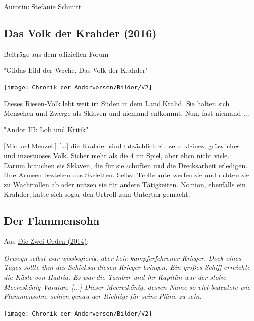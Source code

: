 \documentclass[10pt, a4paper, oneside]{book}
\newcommand{\fillbreak}{\vspace*{\fill}\columnbreak}
\newcommand{\storytext}[1]{%
    \section{#1}%
    \label{Storytext: #1}%
}
\newcommand{\refstorytext}[1]{\hyperref[Storytext: #1]{#1}}
\newcommand{\bildmitts}[2][height=0.32\textwidth,width=0.48\textwidth,keepaspectratio]{%
    \begin{center}
        \texttt{[image: Chronik der Andorversen/Bilder/\#2]}
    \end{center}
}
\newcommand{\bildlinks}[2][height=0.32\textwidth,width=0.48\textwidth,keepaspectratio]{%
    \begin{figure}
        \texttt{[image: Chronik der Andorversen/Bilder/\#2]}
    \end{figure}
}
\begin{document}
\begin{multicols}{2}
Autorin: Stefanie Schmitt




\fillbreak
\storytext{Das Volk der Krahder (2016)}

\begin{center}
    Beiträge aus dem offiziellen Forum

    "Gildas Bild der Woche, Das Volk der Krahder"
\end{center}

\bildmitts{Das Volk der Krahder}

Dieses Riesen-Volk lebt weit im Süden in dem Land Krahd. Sie halten sich Menschen und Zwerge als Sklaven und niemand entkommt. Nun, fast niemand ...

\begin{center}
    "Andor III: Lob und Kritik"
\end{center}


[Michael Menzel:] [...] die Krahder sind tatsächlich ein sehr kleines, grässliches und inzestuöses Volk. Sicher mehr als die 4 im Spiel, aber eben nicht viele. Darum brauchen sie Sklaven, die für sie schuften und die Drecksarbeit erledigen. Ihre Armeen bestehen aus Skeletten. Selbst Trolle unterwerfen sie und richten sie zu Wachtrollen ab oder nutzen sie für andere Tätigkeiten. Nomion, ebenfalls ein Krahder, hatte sich sogar den Urtroll zum Untertan gemacht.




\begin{chapterbox}
    \chapter{Der Flammensohn}
    
    \begin{center}
        Aus \refstorytext{Die Zwei Orden (2014)}:
    \end{center}
    
    \textit{Orweyn selbst war wissbegierig, aber kein kampferfahrener Krieger. Doch eines Tages sollte ihm das Schicksal diesen Krieger bringen. Ein großes Schiff erreichte die Küste von Hadria. Es war die Tambur und ihr Kapitän war der stolze Meereskönig Varatan. [...] Dieser Meereskönig, dessen Name so viel bedeutete wie Flammensohn, schien genau der Richtige für seine Pläne zu sein.}
    
    \bildmitts[width=\textwidth]{Varatan.jpg}    
\end{chapterbox}





\end{multicols}
\end{document}
